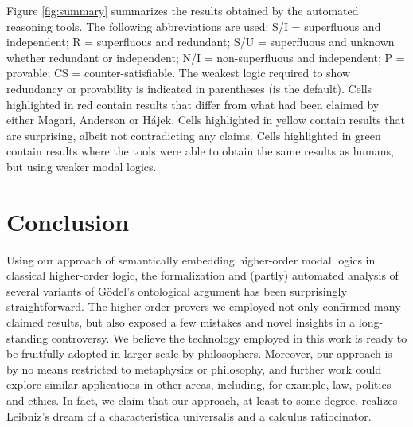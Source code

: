 \documentclass{birkjour}
\theoremstyle{definition}
\theoremstyle{remark}
\numberwithin{equation}{section}
\begin{document}
Figure \ref{fig:summary} summarizes the results obtained by the
automated reasoning tools. The following abbreviations are used: S/I =
superfluous and independent; R = superfluous and redundant; S/U =
superfluous and unknown whether redundant or independent; N/I =
non-superfluous and independent; P = provable; CS =
counter-satisfiable. The weakest logic required to show redundancy or
provability is indicated in parentheses (\K is the default).  Cells
highlighted in \colorbox{\tabred}{red} contain results that differ
from what had been claimed by either Magari, Anderson or Hájek. Cells
highlighted in \colorbox{\tabyellow}{yellow} contain results that are
surprising, albeit not contradicting any claims. Cells highlighted in
\colorbox{\tabgreen}{green} contain results where the tools were able
to obtain the same results as humans, but using weaker modal logics.


\section{Conclusion}
Using our approach of semantically embedding higher-order
modal logics in classical higher-order logic, the formalization and
(partly) automated analysis of several variants of G\"odel's
ontological argument has been surprisingly straightforward. The
higher-order provers we employed not only confirmed many claimed results, but also exposed a
few mistakes and novel insights in a long-standing controversy.  We
believe the technology employed in this work is ready to be fruitfully
adopted in larger scale by philosophers.  Moreover, our approach is
by no means restricted to metaphysics or philosophy, and further work
could explore similar applications in other areas, including, for example,
law, politics and ethics. In fact, we claim that our approach, at
least to some degree, realizes Leibniz's dream of a characteristica universalis
and a calculus ratiocinator.







\sloppy
\printbibliography



\end{document}
